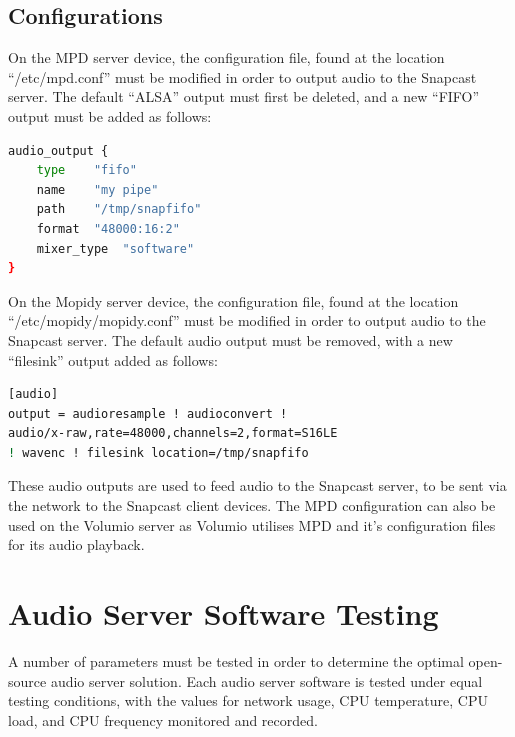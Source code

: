 \documentclass[11pt,a4paper,headinclude=false,footinclude=false]{scrreprt}
\begin{document}
\subsection{Configurations}\label{configurations}

On the MPD server device, the configuration file, found at the location
``/etc/mpd.conf'' must be modified in order to output audio to the
Snapcast server. The default ``ALSA'' output must first be deleted, and
a new ``FIFO'' output must be added as follows:

\lstset{
    caption=MPD SnapServer Configuration,
    basicstyle=\footnotesize, frame=tb,
    xleftmargin=.2\textwidth, xrightmargin=.2\textwidth
}

\begin{lstlisting}[language=bash]
audio_output {
    type    "fifo"
    name    "my pipe"
    path    "/tmp/snapfifo"
    format  "48000:16:2"
    mixer_type  "software"
}
\end{lstlisting}

On the Mopidy server device, the configuration file, found at the
location ``/etc/mopidy/mopidy.conf'' must be modified in order to output
audio to the Snapcast server. The default audio output must be removed,
with a new ``filesink'' output added as follows:

\lstset{
    caption=Mopidy SnapServer Configuration,
    basicstyle=\footnotesize, frame=tb,
    xleftmargin=.2\textwidth, xrightmargin=.2\textwidth
}

\begin{lstlisting}[language=bash]
[audio]
output = audioresample ! audioconvert !
audio/x-raw,rate=48000,channels=2,format=S16LE
! wavenc ! filesink location=/tmp/snapfifo
\end{lstlisting}

These audio outputs are used to feed audio to the Snapcast server, to be
sent via the network to the Snapcast client devices. The MPD
configuration can also be used on the Volumio server as Volumio utilises
MPD and it's configuration files for its audio playback.

\section{Audio Server Software
Testing}\label{audio-server-software-testing}

A number of parameters must be tested in order to determine the optimal
open-source audio server solution. Each audio server software is tested
under equal testing conditions, with the values for network usage, CPU
temperature, CPU load, and CPU frequency monitored and recorded.
\end{document}
